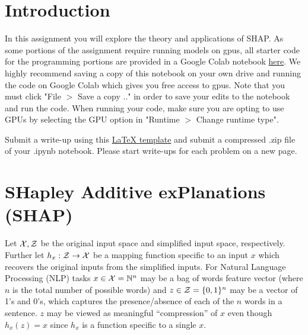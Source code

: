 \section*{Introduction}
In this assignment you will explore the theory and applications of SHAP. As some portions of the assignment require running models on gpus, all starter code for the programming portions are provided in a Google Colab notebook \href{https://colab.research.google.com/drive/1taUuVkNODvoUwPVRFJ3SJz1saiYiHl1z?usp=sharing}{here}. We highly recommend saving a copy of this notebook on your own drive and running the code on Google Colab which gives you free access to gpus. Note that you must click "File $>$ Save a copy .." in order to save your edits to the notebook and run the code. When running your code, make sure you are opting to use GPUs by selecting the GPU option in "Runtime $>$ Change runtime type". 

Submit a write-up using this \href{https://stanfordaiethics.github.io/assignments.html}{LaTeX template} and submit a compressed .zip file of your .ipynb notebook. Please start write-ups for each problem on a new page. 

\section*{SHapley Additive exPlanations (SHAP)}
Let ${\mathcal{X}}, {\mathcal{Z}}$ be the original input space and simplified input space, respectively. Further let $h_{x}: {\mathcal{Z}} \rightarrow \mathcal{X}$ be a mapping function specific to an input $x$ which recovers the original inputs from the simplified inputs. For Natural Language Processing (NLP) tasks $x \in {\mathcal{X}} = {\mathbb{N}}^{n}$ may be a bag of words feature vector (where $n$ is the total number of possible words) and $z \in {\mathcal{Z}} = \{0, 1\}^{n}$ may be a vector of 1's and 0's, which captures the presence/absence of each of the $n$ words in a sentence. $z$ may be viewed as meaningful ``compression'' of $x$ even though $h_{x}(z) = x$ since $h_{x}$ is a function specific to a single $x$.

